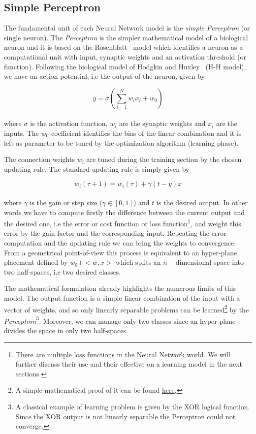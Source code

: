 \documentclass{standalone}
\begin{document}
\subsection[Simple Perceptron]{Simple Perceptron}\label{NN:perceptron}

The fundamental unit of each Neural Network model is the \emph{simple Perceptron} (or single neuron).
The \emph{Perceptron} is the simpler mathematical model of a biological neuron and it is based on the Rosenblatt~\cite{Rosenblatt58theperceptron} model which identifies a neuron as a computational unit with input, synaptic weights and an activation threshold (or function).
Following the biological model of Hodgkin and Huxley~\cite{HHmodel} (H-H model), we have an action potential, i.e the output of the neuron, given by

\begin{equation}
y = \sigma\left(\sum_{i=1}^{N}w_i x_i + w_0 \right)
\end{equation}
\\
where $\sigma$ is the activation function, $w_i$ are the synaptic weights and $x_i$ are the inputs.
The $w_0$ coefficient identifies the bias of the linear combination and it is left as parameter to be tuned by the optimization algorithm (learning phase).

The connection weights $w_i$ are tuned during the training section by the chosen updating rule.
The standard updating rule is simply given by

\begin{equation}
w_i(\tau + 1) = w_i(\tau) + \gamma(t - y)x
\end{equation}
\\
where $\gamma$ is the gain or step size ($\gamma \in [0, 1]$) and $t$ is the desired output.
In other words we have to compute firstly the difference between the current output and the desired one, i.e the error or cost function or loss function\footnote{
  There are multiple loss functions in the Neural Network world.
  We will further discuss their use and their effective on a learning model in the next sections.
}, and weight this error by the gain factor and the corresponding input.
Repeating the error computation and the updating rule we can bring the weights to convergence.
From a geometrical point-of-view this process is equivalent to an hyper-plane placement defined by $w_0 + < w, x >$ which splits an $n-$dimensional space into two half-spaces, i.e two desired classes.

The mathematical formulation already highlights the numerous limits of this model.
The output function is a simple linear combination of the input with a vector of weights, and so only linearly separable problems can be learned\footnote{
  A simple mathematical proof of it can be found \href{http://www.cs.columbia.edu/~mcollins/courses/6998-2012/notes/perc.converge.pdf}{here}.
} by the \emph{Perceptron}\footnote{
  A classical example of learning problem is given by the XOR logical function.
  Since the XOR output is not linearly separable the Perceptron could not converge.
}.
Moreover, we can manage only two classes since an hyper-plane divides the space in only two half-spaces.
\end{document}
